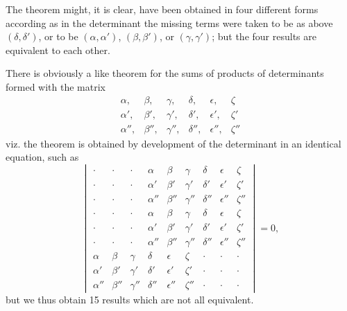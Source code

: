 \documentclass[11pt,a4paper]{book}
\begin{document}
The theorem might, it is clear, have been obtained in four different forms according as in the determinant the missing terms were taken to be as above $(\delta, \delta')$, or to be $(\alpha, \alpha')$, $(\beta, \beta')$, or $(\gamma, \gamma')$; but the four results are equivalent to each other.

There is obviously a like theorem for the sums of products of determinants formed with the matrix
\[
\begin{matrix}
\alpha, & \beta, & \gamma, & \delta, & \epsilon, & \zeta \\
\alpha', & \beta', & \gamma', & \delta', & \epsilon', & \zeta' \\
\alpha'', & \beta'', & \gamma'', & \delta'', & \epsilon'', & \zeta''
\end{matrix}
\]
viz. the theorem is obtained by development of the determinant in an identical equation, such as
\[
\begin{vmatrix}
\cdot & \cdot & \cdot & \alpha & \beta & \gamma & \delta & \epsilon & \zeta \\
\cdot & \cdot & \cdot & \alpha' & \beta' & \gamma' & \delta' & \epsilon' & \zeta' \\
\cdot & \cdot & \cdot & \alpha'' & \beta'' & \gamma'' & \delta'' & \epsilon'' & \zeta'' \\
\cdot & \cdot & \cdot & \alpha & \beta & \gamma & \delta & \epsilon & \zeta \\
\cdot & \cdot & \cdot & \alpha' & \beta' & \gamma' & \delta' & \epsilon' & \zeta' \\
\cdot & \cdot & \cdot & \alpha'' & \beta'' & \gamma'' & \delta'' & \epsilon'' & \zeta'' \\
\alpha & \beta & \gamma & \delta & \epsilon & \zeta & \cdot & \cdot & \cdot \\
\alpha' & \beta' & \gamma' & \delta' & \epsilon' & \zeta' & \cdot & \cdot & \cdot \\
\alpha'' & \beta'' & \gamma'' & \delta'' & \epsilon'' & \zeta'' & \cdot & \cdot & \cdot
\end{vmatrix} = 0,
\]
but we thus obtain 15 results which are not all equivalent.
\end{document}
